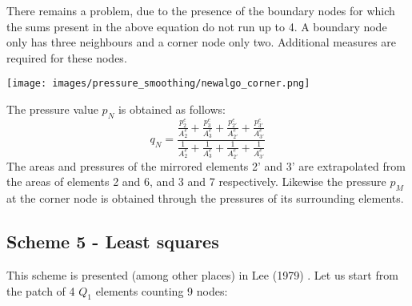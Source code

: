There remains a problem, due to the presence of the boundary nodes for which 
the sums present in the above equation do not run up to 4. A boundary
node only has three neighbours and a corner node only two. Additional measures
are required for these nodes. 

\begin{center}
\texttt{[image: images/pressure\_smoothing/newalgo\_corner.png]}
\end{center}

The pressure value $p_N$ is obtained as follows:
\[
q_N = \frac{ 
 \frac{p_2^e}   {A_2^e}
+\frac{p_3^e}   {A_3^e}
+\frac{p_{2'}^e}{A_{2'}^e}
+\frac{p_{3'}^e}{A_{3'}^e}
}{
 \frac{1}{A_2^e}
+\frac{1}{A_3^e}
+\frac{1}{A_{2'}^e}
+\frac{1}{A_{3'}^e}
}
\]
The areas and pressures of the mirrored elements 2' and 3' are extrapolated from the areas of elements 2 and 6, and 3 and 7 respectively. 
Likewise the pressure $p_M$ at the corner node is obtained through the pressures of its surrounding elements.


\subsection{Scheme 5 - Least squares} 

This scheme is presented (among other places) in Lee \etal (1979)
\cite{legs79}. 
Let us start from the patch of 4 $Q_1$ elements counting 9 nodes: 

\begin{center}
\end{center}



